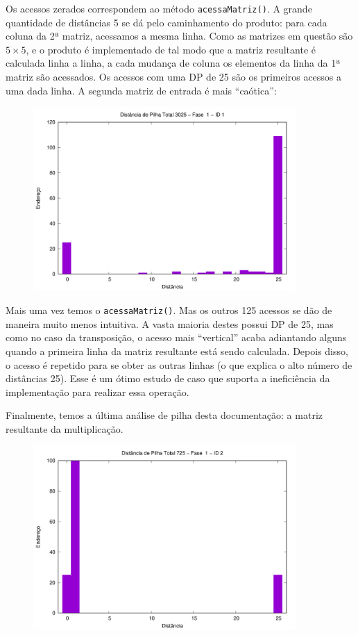 \documentclass{article}
\def\code#1{\texttt{#1}}
\begin{document}
Os acessos zerados correspondem ao método \code{acessaMatriz()}. A grande quantidade de distâncias 5 se dá pelo caminhamento do produto: para cada coluna da 2ª matriz, acessamos a mesma linha. Como as matrizes em questão são \( 5 \times 5 \), e o produto é implementado de tal modo que a matriz resultante é calculada linha a linha, a cada mudança de coluna os elementos da linha da 1ª matriz são acessados. Os acessos com uma DP de 25 são os primeiros acessos a uma dada linha. A segunda matriz de entrada é mais ``caótica'':

\begin{figure} [H]
    \includegraphics[width=10cm]{m-hist-1-1.png} 
    \centering
\end{figure}

Mais uma vez temos o \code{acessaMatriz()}. Mas os outros 125 acessos se dão de maneira muito menos intuitiva. A vasta maioria destes possui DP de 25, mas como no caso da transposição, o acesso mais ``vertical'' acaba adiantando alguns quando a primeira linha da matriz resultante está sendo calculada. Depois disso, o acesso é repetido para se obter as outras linhas (o que explica o alto número de distâncias 25). Esse é um ótimo estudo de caso que suporta a ineficiência da implementação para realizar essa operação.

Finalmente, temos a última análise de pilha desta documentação: a matriz resultante da multiplicação.

\begin{figure} [H]
    \includegraphics[width=10cm]{m-hist-1-2.png} 
    \centering
\end{figure}
\end{document}
